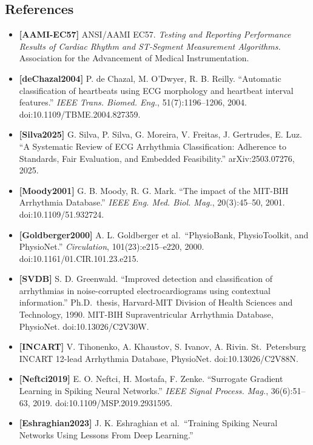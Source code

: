 \documentclass[
]{article}
\providecommand{\tightlist}{%
  \setlength{\itemsep}{0pt}\setlength{\parskip}{0pt}}
\begin{document}
\subsection{References}\label{references}

\begin{itemize}
\tightlist
\item
  \textbf{{[}AAMI-EC57{]}} ANSI/AAMI EC57. \emph{Testing and Reporting
  Performance Results of Cardiac Rhythm and ST-Segment Measurement
  Algorithms.} Association for the Advancement of Medical
  Instrumentation.
\item
  \textbf{{[}deChazal2004{]}} P. de Chazal, M. O'Dwyer, R. B. Reilly.
  ``Automatic classification of heartbeats using ECG morphology and
  heartbeat interval features.'' \emph{IEEE Trans. Biomed. Eng.},
  51(7):1196--1206, 2004. doi:10.1109/TBME.2004.827359.
\item
  \textbf{{[}Silva2025{]}} G. Silva, P. Silva, G. Moreira, V. Freitas,
  J. Gertrudes, E. Luz. ``A Systematic Review of ECG Arrhythmia
  Classification: Adherence to Standards, Fair Evaluation, and Embedded
  Feasibility.'' arXiv:2503.07276, 2025.
\item
  \textbf{{[}Moody2001{]}} G. B. Moody, R. G. Mark. ``The impact of the
  MIT-BIH Arrhythmia Database.'' \emph{IEEE Eng. Med. Biol. Mag.},
  20(3):45--50, 2001. doi:10.1109/51.932724.
\item
  \textbf{{[}Goldberger2000{]}} A. L. Goldberger et al.~``PhysioBank,
  PhysioToolkit, and PhysioNet.'' \emph{Circulation},
  101(23):e215--e220, 2000. doi:10.1161/01.CIR.101.23.e215.
\item
  \textbf{{[}SVDB{]}} S. D. Greenwald. ``Improved detection and
  classification of arrhythmias in noise-corrupted electrocardiograms
  using contextual information.'' Ph.D.~thesis, Harvard-MIT Division of
  Health Sciences and Technology, 1990. MIT-BIH Supraventricular
  Arrhythmia Database, PhysioNet. doi:10.13026/C2V30W.
\item
  \textbf{{[}INCART{]}} V. Tihonenko, A. Khaustov, S. Ivanov, A. Rivin.
  St.~Petersburg INCART 12-lead Arrhythmia Database, PhysioNet.
  doi:10.13026/C2V88N.
\item
  \textbf{{[}Neftci2019{]}} E. O. Neftci, H. Mostafa, F. Zenke.
  ``Surrogate Gradient Learning in Spiking Neural Networks.'' \emph{IEEE
  Signal Process. Mag.}, 36(6):51--63, 2019.
  doi:10.1109/MSP.2019.2931595.
\item
  \textbf{{[}Eshraghian2023{]}} J. K. Eshraghian et al.~``Training
  Spiking Neural Networks Using Lessons From Deep Learning.''

\end{itemize}
\end{document}
